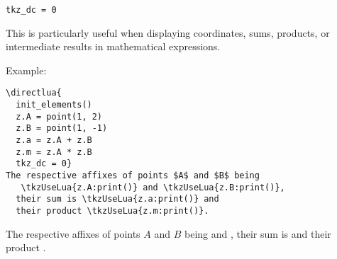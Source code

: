 \begin{verbatim}
tkz_dc = 0
\end{verbatim}

\medskip
\noindent
This is particularly useful when displaying coordinates, sums, products, or intermediate results in mathematical expressions.

\medskip
\noindent
Example:

\begin{verbatim}
\directlua{
  init_elements()
  z.A = point(1, 2)
  z.B = point(1, -1)
  z.a = z.A + z.B
  z.m = z.A * z.B
  tkz_dc = 0}
The respective affixes of points $A$ and $B$ being 
   \tkzUseLua{z.A:print()} and \tkzUseLua{z.B:print()},
  their sum is \tkzUseLua{z.a:print()} and 
  their product \tkzUseLua{z.m:print()}.
\end{verbatim}


The respective affixes of points $A$ and $B$ being 
    and ,
  their sum is  and 
  their product .





\endinput